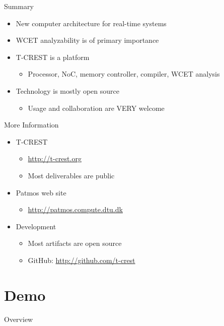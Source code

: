 \documentclass[17pt]{beamer}
\begin{document}
\begin{frame}{Summary}
  \begin{itemize}
  \item New computer architecture for real-time systems
  \item WCET analyzability is of primary importance
  \item T-CREST is a platform
    \begin{itemize}
    \item Processor, NoC, memory controller, compiler, WCET analysis
    \end{itemize}
  \item Technology is mostly open source
    \begin{itemize}
    \item Usage and collaboration are VERY welcome
    \end{itemize}
  \end{itemize}
\end{frame}

\begin{frame}{More Information}
  \begin{itemize}
  \item T-CREST
    \begin{itemize}
    \item \url{http://t-crest.org}
    \item Most deliverables are public
    \end{itemize}
  \item Patmos web site
    \begin{itemize}
    \item \url{http://patmos.compute.dtu.dk}
    \end{itemize}
  \item Development
    \begin{itemize}
    \item Most artifacts are open source
    \item GitHub: \url{http://github.com/t-crest}
    \end{itemize}
  \end{itemize}
\end{frame}

\section{Demo}

\begin{frame}{Overview}
  \tableofcontents[currentsection]
\end{frame}
\end{document}

